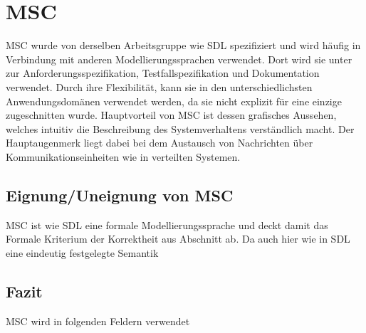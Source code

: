 \section{MSC}
\label{sc:MSCB}
\ac{MSC} wurde von derselben Arbeitsgruppe wie \ac{SDL} spezifiziert und wird häufig in Verbindung mit anderen Modellierungssprachen verwendet. Dort wird sie unter zur Anforderungsspezifikation, Testfallspezifikation und Dokumentation verwendet. Durch ihre Flexibilität, kann sie in den unterschiedlichsten Anwendungsdomänen verwendet werden, da sie nicht explizit für eine einzige zugeschnitten wurde. Hauptvorteil von \ac{MSC} ist dessen grafisches Aussehen, welches intuitiv die Beschreibung des Systemverhaltens verständlich macht. Der Hauptaugenmerk liegt dabei bei dem Austausch von Nachrichten über Kommunikationseinheiten wie in verteilten Systemen.
\subsection{Eignung/Uneignung von MSC}
\label{sc:MSCEignung}
\ac{MSC} ist wie \ac{SDL} eine formale Modellierungssprache und deckt damit das Formale Kriterium der Korrektheit aus Abschnitt \pageref{ssc:Korrektheit} ab. Da auch hier wie in \ac{SDL} eine eindeutig festgelegte Semantik 


\subsection{Fazit}
\label{sc:MSCFazit}



MSC wird in folgenden Feldern verwendet
